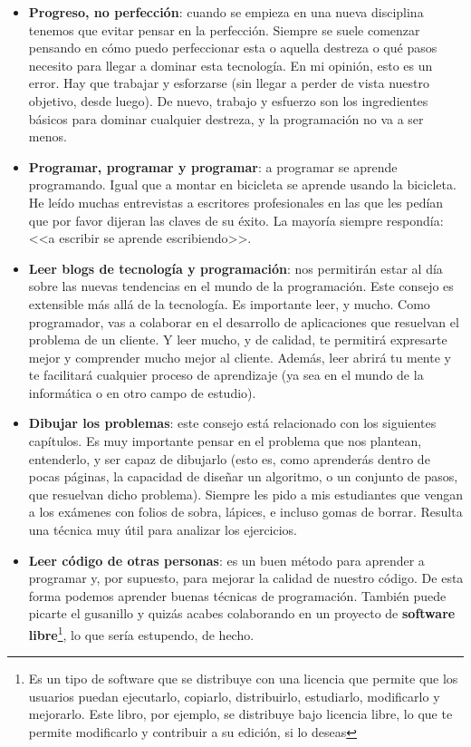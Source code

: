 \begin{itemize}
 \item \textbf{Progreso, no perfección}: cuando se empieza en una nueva disciplina tenemos que evitar pensar en la perfección. Siempre se suele
 comenzar pensando en cómo puedo perfeccionar esta o aquella destreza o qué pasos necesito para llegar a dominar esta tecnología. En mi 
 opinión, esto es un error. Hay que trabajar y esforzarse (sin llegar a perder de vista nuestro objetivo, desde luego). De nuevo, trabajo
 y esfuerzo son los ingredientes básicos para dominar cualquier destreza, y la programación no va a ser menos.
 
 \item \textbf{Programar, programar y programar}: a programar se aprende programando. Igual que a montar en bicicleta se aprende usando la bicicleta. 
 He leído muchas entrevistas a escritores profesionales en las que les pedían que por favor dijeran las claves de su éxito. La mayoría
 siempre respondía: <<a escribir se aprende escribiendo>>.

 \item \textbf{Leer blogs de tecnología y programación}: nos permitirán estar al día sobre las nuevas tendencias en el mundo de la programación. 
 Este consejo es extensible más allá de la tecnología. Es importante leer, y mucho. Como programador, vas a colaborar en el desarrollo
 de aplicaciones que resuelvan el problema de un cliente. Y leer mucho, y de calidad, te permitirá expresarte mejor y comprender mucho
 mejor al cliente. Además, leer abrirá tu mente y te facilitará cualquier proceso de aprendizaje (ya sea en el mundo de la informática o en 
 otro campo de estudio).
 
 \item \textbf{Dibujar los problemas}: este consejo está relacionado con los siguientes capítulos. Es muy importante
 pensar en el problema que nos plantean, entenderlo, y ser capaz de dibujarlo (esto es, como aprenderás dentro de pocas páginas, la capacidad de diseñar un 
 algoritmo, o un conjunto de pasos, que resuelvan dicho problema). Siempre les pido a mis estudiantes que vengan a los exámenes con folios de sobra,
 lápices, e incluso gomas de borrar. Resulta una técnica muy útil para analizar los ejercicios.
 
 \item \textbf{Leer código de otras personas}: es un buen método para aprender a programar y, por supuesto, para mejorar la calidad de
 nuestro código. De esta forma podemos aprender buenas técnicas de programación. También puede picarte el gusanillo y quizás acabes
 colaborando en un proyecto de \textbf{software libre}\footnote{Es un tipo de software que se distribuye con una licencia
 que permite que los usuarios puedan ejecutarlo, copiarlo, distribuirlo, estudiarlo, modificarlo y mejorarlo. Este libro, por
 ejemplo, se distribuye bajo licencia libre, lo que te permite modificarlo y contribuir a su edición, si lo deseas}, lo que sería estupendo, de hecho.


\end{itemize}

